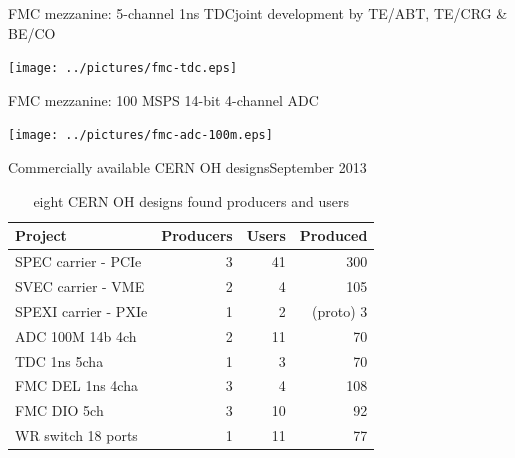 \documentclass[compress,red]{beamer}
\begin{document}
\begin{frame}{FMC mezzanine: 5-channel 1ns TDC}{joint development by TE/ABT, TE/CRG \& BE/CO}

  \begin{center}
    \texttt{[image: ../pictures/fmc-tdc.eps]}
  \end{center}

\end{frame}

\begin{frame}{FMC mezzanine: 100 MSPS 14-bit 4-channel ADC}

  \begin{center}
    \texttt{[image: ../pictures/fmc-adc-100m.eps]}
  \end{center}

\end{frame}

\begin{frame}{Commercially available CERN OH designs}{September 2013}

  \begin{table}
    \centering

    \begin{tabular}{|l||r|r|r|}  
      \hline
      Project & Producers & Users & Produced\\
      \hline\hline
      SPEC carrier - PCIe & 3 & 41 & 300 \\  
      \hline
      SVEC carrier - VME & 2 & 4 & 105 \\
      \hline
      SPEXI carrier - PXIe & 1 & 2 & (proto) 3 \\  
      \hline
      \hline
      ADC 100M 14b 4ch & 2 & 11 & 70 \\
      \hline
      TDC 1ns 5cha & 1 & 3 & 70 \\
      \hline
      FMC DEL 1ns 4cha & 3 & 4 & 108 \\
      \hline
      FMC DIO 5ch & 3 & 10 & 92 \\
      \hline
      WR switch 18 ports & 1 & 11 & 77 \\
      \hline
    \end{tabular}

    \caption{eight CERN OH designs found producers and users}
  \end{table}

\end{frame}
\end{document}
